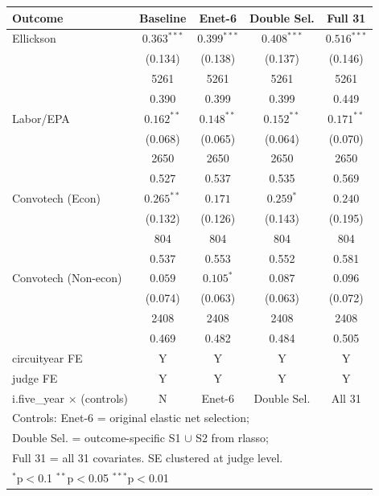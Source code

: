 \begin{tabular}{lcccc}
\toprule
Outcome & Baseline & Enet-6 & Double Sel. & Full 31 \\
\midrule
Ellickson & \(0.363^{***}\) & \(0.399^{***}\) & \(0.408^{***}\) & \(0.516^{***}\) \\
 & (0.134) & (0.138) & (0.137) & (0.146) \\
 & 5261 & 5261 & 5261 & 5261 \\
 & 0.390 & 0.399 & 0.399 & 0.449 \\
Labor/EPA & \(0.162^{**}\) & \(0.148^{**}\) & \(0.152^{**}\) & \(0.171^{**}\) \\
 & (0.068) & (0.065) & (0.064) & (0.070) \\
 & 2650 & 2650 & 2650 & 2650 \\
 & 0.527 & 0.537 & 0.535 & 0.569 \\
Convotech (Econ) & \(0.265^{**}\) & \(0.171\) & \(0.259^{*}\) & \(0.240\) \\
 & (0.132) & (0.126) & (0.143) & (0.195) \\
 & 804 & 804 & 804 & 804 \\
 & 0.537 & 0.553 & 0.552 & 0.581 \\
Convotech (Non-econ) & \(0.059\) & \(0.105^{*}\) & \(0.087\) & \(0.096\) \\
 & (0.074) & (0.063) & (0.063) & (0.072) \\
 & 2408 & 2408 & 2408 & 2408 \\
 & 0.469 & 0.482 & 0.484 & 0.505 \\
\midrule
circuityear FE & Y & Y & Y & Y \\
judge FE & Y & Y & Y & Y \\
i.five\_year $\times$ (controls) & N & Enet-6 & Double Sel. & All 31 \\
\bottomrule
\multicolumn{5}{l}{\footnotesize Controls: Enet-6 = original elastic net selection;} \\
\multicolumn{5}{l}{\footnotesize Double Sel. = outcome-specific S1 $\cup$ S2 from rlasso;} \\
\multicolumn{5}{l}{\footnotesize Full 31 = all 31 covariates. SE clustered at judge level.} \\
\multicolumn{5}{l}{\footnotesize \(^{*}\)p\(<\)0.1 \(^{**}\)p\(<\)0.05 \(^{***}\)p\(<\)0.01} \\
\end{tabular}
